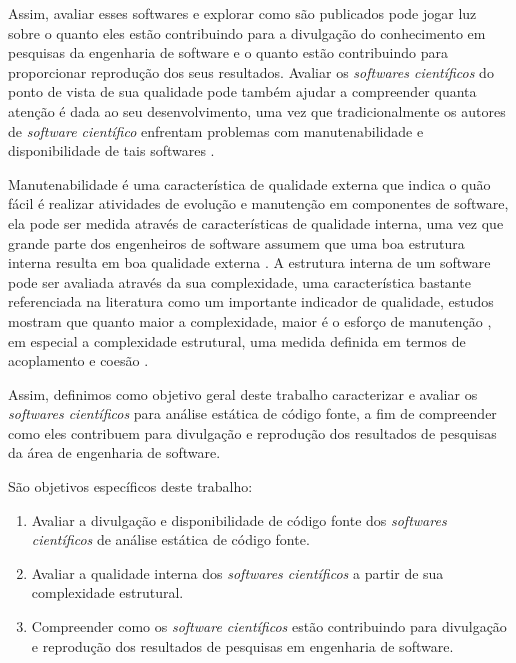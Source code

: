

Assim, avaliar esses softwares e explorar como são publicados pode jogar luz
sobre o quanto eles estão contribuindo para a divulgação do conhecimento em
pesquisas da engenharia de software e o quanto estão contribuindo para
proporcionar reprodução dos seus resultados. Avaliar os {\it softwares
científicos} do ponto de vista de sua qualidade pode também ajudar a
compreender quanta atenção é dada ao seu desenvolvimento, uma vez que
tradicionalmente os autores de {\it software científico} enfrentam problemas
com manutenabilidade e disponibilidade de tais softwares \cite{Prlic2012}.

Manutenabilidade é uma característica de qualidade externa que indica o quão
fácil é realizar atividades de evolução e manutenção em componentes de
software, ela pode ser medida através de características de qualidade interna,
uma vez que grande parte dos engenheiros de software assumem que uma boa
estrutura interna resulta em boa qualidade externa \cite{Fenton2014}. A
estrutura interna de um software pode ser avaliada através da sua complexidade,
uma característica bastante referenciada na literatura como um importante
indicador de qualidade, estudos mostram que quanto maior a complexidade, maior
é o esforço de manutenção \cite{hashim1996software, Darcy2005}, em especial a
complexidade estrutural, uma medida definida em termos de acoplamento e coesão
\cite{Terceiro2012}.

Assim, definimos como objetivo geral deste trabalho caracterizar e avaliar os
{\it softwares científicos} para análise estática de código fonte, a fim de
compreender como eles contribuem para divulgação e reprodução dos resultados de
pesquisas da área de engenharia de software.

São objetivos específicos deste trabalho:

\begin{enumerate}
  \item Avaliar a divulgação e disponibilidade de código fonte dos {\it softwares científicos} de análise estática de código fonte.
  \item Avaliar a qualidade interna dos {\it softwares científicos} a partir de sua complexidade estrutural.
  \item Compreender como os {\it software científicos} estão contribuindo para divulgação e reprodução dos resultados de pesquisas em engenharia de software.
\end{enumerate}

